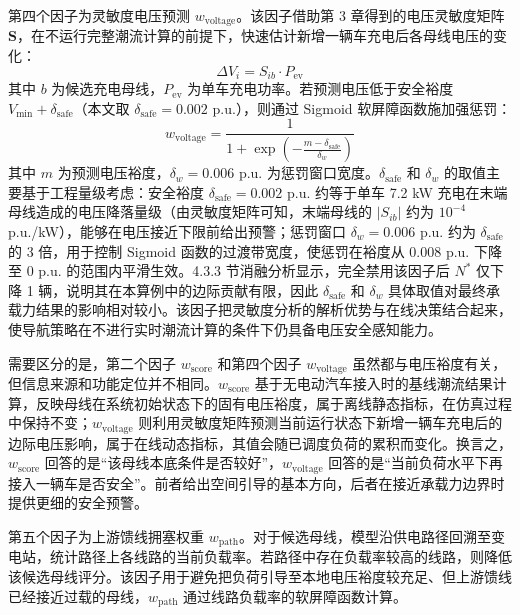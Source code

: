 \documentclass[10pt,a4paper]{article}
\numberwithin{equation}{section}
\numberwithin{table}{section}
\numberwithin{figure}{section}
\begin{document}
    第四个因子为灵敏度电压预测 $w_{\text{voltage}}$。该因子借助第 3 章得到的电压灵敏度矩阵 $\mathbf{S}$，在不运行完整潮流计算的前提下，快速估计新增一辆车充电后各母线电压的变化：
    \begin{equation}
        \label{eq:navigation_voltage_delta}
        \Delta V_i = S_{ib} \cdot P_{\text{ev}}
    \end{equation}
    其中 $b$ 为候选充电母线，$P_{\text{ev}}$ 为单车充电功率。若预测电压低于安全裕度 $V_{\min} + \delta_{\text{safe}}$（本文取 $\delta_{\text{safe}} = 0.002$ p.u.），则通过 Sigmoid 软屏障函数施加强惩罚：
    \begin{equation}
        \label{eq:navigation_voltage_weight}
        w_{\text{voltage}} = \frac{1}{1 + \exp\left(-\frac{m - \delta_{\text{safe}}}{\delta_w}\right)}
    \end{equation}
    其中 $m$ 为预测电压裕度，$\delta_w = 0.006$ p.u. 为惩罚窗口宽度。$\delta_{\text{safe}}$ 和 $\delta_w$ 的取值主要基于工程量级考虑：安全裕度 $\delta_{\text{safe}} = 0.002$ p.u. 约等于单车 7.2 kW 充电在末端母线造成的电压降落量级（由灵敏度矩阵可知，末端母线的 $|S_{ib}|$ 约为 $10^{-4}$ p.u./kW），能够在电压接近下限前给出预警；惩罚窗口 $\delta_w = 0.006$ p.u. 约为 $\delta_{\text{safe}}$ 的 3 倍，用于控制 Sigmoid 函数的过渡带宽度，使惩罚在裕度从 0.008 p.u. 下降至 0 p.u. 的范围内平滑生效。4.3.3 节消融分析显示，完全禁用该因子后 $N^*$ 仅下降 1 辆，说明其在本算例中的边际贡献有限，因此 $\delta_{\text{safe}}$ 和 $\delta_w$ 具体取值对最终承载力结果的影响相对较小。该因子把灵敏度分析的解析优势与在线决策结合起来，使导航策略在不进行实时潮流计算的条件下仍具备电压安全感知能力。

    需要区分的是，第二个因子 $w_{\text{score}}$ 和第四个因子 $w_{\text{voltage}}$ 虽然都与电压裕度有关，但信息来源和功能定位并不相同。$w_{\text{score}}$ 基于无电动汽车接入时的基线潮流结果计算，反映母线在系统初始状态下的固有电压裕度，属于离线静态指标，在仿真过程中保持不变；$w_{\text{voltage}}$ 则利用灵敏度矩阵预测当前运行状态下新增一辆车充电后的边际电压影响，属于在线动态指标，其值会随已调度负荷的累积而变化。换言之，$w_{\text{score}}$ 回答的是“该母线本底条件是否较好”，$w_{\text{voltage}}$ 回答的是“当前负荷水平下再接入一辆车是否安全”。前者给出空间引导的基本方向，后者在接近承载力边界时提供更细的安全预警。

    第五个因子为上游馈线拥塞权重 $w_{\text{path}}$。对于候选母线，模型沿供电路径回溯至变电站，统计路径上各线路的当前负载率。若路径中存在负载率较高的线路，则降低该候选母线评分。该因子用于避免把负荷引导至本地电压裕度较充足、但上游馈线已经接近过载的母线，$w_{\text{path}}$ 通过线路负载率的软屏障函数计算。
\end{document}
